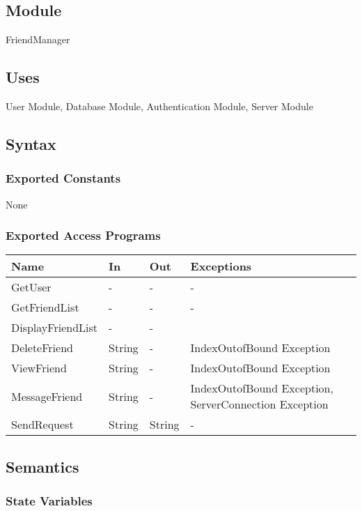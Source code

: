 \documentclass[12pt, titlepage]{article}
\begin{document}
\subsection{Module}

FriendManager

\subsection{Uses}

User Module, Database Module, Authentication Module, Server Module

\subsection{Syntax}

\subsubsection{Exported Constants}
None

\subsubsection{Exported Access Programs}
\begin{center}
\begin{tabular}{p{4cm} p{2cm} p{4cm} p{4cm}}
\hline
\textbf{Name} & \textbf{In} & \textbf{Out} & \textbf{Exceptions} \\
\hline
GetUser & - & - & - \\
GetFriendList & - & - & - \\
DisplayFriendList & - & -\\
DeleteFriend & String & - & IndexOutofBound Exception \\
ViewFriend & String & - & IndexOutofBound Exception\\
MessageFriend & String & - & IndexOutofBound Exception, ServerConnection Exception\\
SendRequest & String & String & -\\
\hline
\end{tabular}
\end{center}

\subsection{Semantics}

\subsubsection{State Variables}
\end{document}
